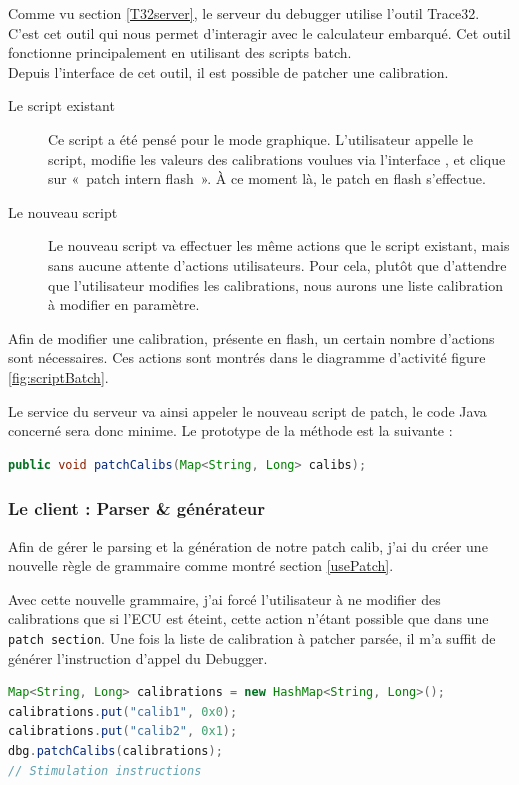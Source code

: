 	Comme vu section \ref{T32server}, le serveur du debugger utilise l'outil Trace32. C'est cet outil qui nous permet d’interagir avec le calculateur embarqué. Cet outil fonctionne principalement en utilisant des scripts batch.\\
	Depuis l'interface de cet outil, il est possible de patcher une calibration.

	\begin{description}
		\item[Le script existant] Ce script a été pensé pour le mode graphique. L'utilisateur appelle le script, modifie les valeurs des calibrations voulues via l'interface , et clique sur «~patch intern flash~». À ce moment là, le patch en flash s'effectue.
		\item[Le nouveau script] Le nouveau script va effectuer les même actions que le script existant, mais sans aucune attente d'actions utilisateurs. Pour cela, plutôt que d'attendre que l'utilisateur modifies les calibrations, nous aurons une liste calibration à modifier en paramètre.
	\end{description}

	Afin de modifier une calibration, présente en flash, un certain nombre d'actions sont nécessaires. Ces actions sont montrés dans le diagramme d'activité figure \ref{fig:scriptBatch}.
	
	Le service du serveur va ainsi appeler le nouveau script de patch, le code Java concerné sera donc minime. Le prototype de la méthode est la suivante : 
	\begin{lstlisting}[language=Java, numbers=none]
public void patchCalibs(Map<String, Long> calibs);
	\end{lstlisting}

	\subsubsection{Le client : Parser \& générateur}
	Afin de gérer le parsing et la génération de notre patch calib, j'ai du créer une nouvelle règle de grammaire comme montré section \ref{usePatch}. 
	
	Avec cette nouvelle grammaire, j'ai forcé l'utilisateur à ne modifier des calibrations que si l'ECU est éteint, cette action n'étant possible que dans une \texttt{patch section}. Une fois la liste de calibration à patcher parsée, il m'a suffit de générer l'instruction d'appel du Debugger.
	
	\begin{lstlisting}[language=Java]
Map<String, Long> calibrations = new HashMap<String, Long>();
calibrations.put("calib1", 0x0);
calibrations.put("calib2", 0x1);
dbg.patchCalibs(calibrations);
// Stimulation instructions
	\end{lstlisting}
	
